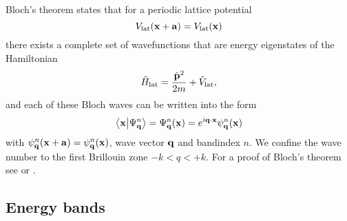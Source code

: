 Bloch's theorem states that for a periodic lattice potential
\begin{equation}
  V_\text{lat}(\vb{x}+\vb{a})=V_\text{lat}(\vb{x})
  \label{eq:potential_periodic}
\end{equation}
there exists a complete set of wavefunctions that are energy eigenstates
of the Hamiltonian
\begin{equation}
  \hat{H}_\text{lat}
  =\frac{\hat{\vb{p}}^2}{2m}+\hat{V}_\text{lat}
  \label{eq:hamiltonian_periodic},
\end{equation}
and each of these Bloch waves can be written into the form
\begin{equation}
  \bra{\vb{x}}\ket{\Psi^n_{\vb{q}}}
  =\Psi^n_{\vb{q}}(\vb{x})
  =e^{i\vb{q}\cdot\vb{x}}\psi^n_{\vb{q}}(\vb{x})
  \label{eq:state_bloch}
\end{equation}
with $\psi^n_{\vb{q}}(\vb{x}+\vb{a})=\psi^n_{\vb{q}}(\vb{x})$, wave vector
$\vb{q}$ and bandindex $n$. We confine the wave number to the first Brillouin
zone $-k<q<+k$. For a proof of Bloch's theorem see \cite{Roessler2004} or
\cite{Bartelmann2018}.

\subsection{Energy bands}

